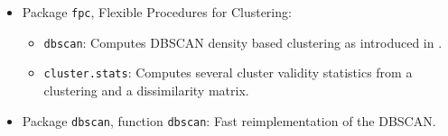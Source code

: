 \begin{itemize}
	\item Package \texttt{fpc}, Flexible Procedures for Clustering:
	      \begin{itemize}
		      \item \texttt{dbscan}: Computes DBSCAN density based clustering as introduced
		            in \cite{ester_density-based_1996}.
		      \item \texttt{cluster.stats}: Computes several cluster validity statistics from a
		            clustering and a dissimilarity matrix.
	      \end{itemize}
	\item Package \texttt{dbscan}, function \texttt{dbscan}: Fast reimplementation of the
	      DBSCAN.
\end{itemize}
